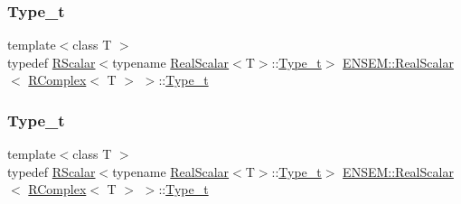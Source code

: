 \subsubsection{\texorpdfstring{Type\_t}{Type\_t}\hspace{0.1cm}{\footnotesize\ttfamily [1/3]}}
{\footnotesize\ttfamily template$<$class T $>$ \\
typedef \mbox{\hyperlink{classENSEM_1_1RScalar}{R\+Scalar}}$<$typename \mbox{\hyperlink{structENSEM_1_1RealScalar}{Real\+Scalar}}$<$T$>$\+::\mbox{\hyperlink{structENSEM_1_1RealScalar_3_01RComplex_3_01T_01_4_01_4_a8e52d83700f12173749eb640b815684c}{Type\+\_\+t}}$>$ \mbox{\hyperlink{structENSEM_1_1RealScalar}{E\+N\+S\+E\+M\+::\+Real\+Scalar}}$<$ \mbox{\hyperlink{classENSEM_1_1RComplex}{R\+Complex}}$<$ T $>$ $>$\+::\mbox{\hyperlink{structENSEM_1_1RealScalar_3_01RComplex_3_01T_01_4_01_4_a8e52d83700f12173749eb640b815684c}{Type\+\_\+t}}}

\mbox{\label{structENSEM_1_1RealScalar_3_01RComplex_3_01T_01_4_01_4_a8e52d83700f12173749eb640b815684c}} 
\subsubsection{\texorpdfstring{Type\_t}{Type\_t}\hspace{0.1cm}{\footnotesize\ttfamily [2/3]}}
{\footnotesize\ttfamily template$<$class T $>$ \\
typedef \mbox{\hyperlink{classENSEM_1_1RScalar}{R\+Scalar}}$<$typename \mbox{\hyperlink{structENSEM_1_1RealScalar}{Real\+Scalar}}$<$T$>$\+::\mbox{\hyperlink{structENSEM_1_1RealScalar_3_01RComplex_3_01T_01_4_01_4_a8e52d83700f12173749eb640b815684c}{Type\+\_\+t}}$>$ \mbox{\hyperlink{structENSEM_1_1RealScalar}{E\+N\+S\+E\+M\+::\+Real\+Scalar}}$<$ \mbox{\hyperlink{classENSEM_1_1RComplex}{R\+Complex}}$<$ T $>$ $>$\+::\mbox{\hyperlink{structENSEM_1_1RealScalar_3_01RComplex_3_01T_01_4_01_4_a8e52d83700f12173749eb640b815684c}{Type\+\_\+t}}}

\mbox{\label{structENSEM_1_1RealScalar_3_01RComplex_3_01T_01_4_01_4_a8e52d83700f12173749eb640b815684c}} 
